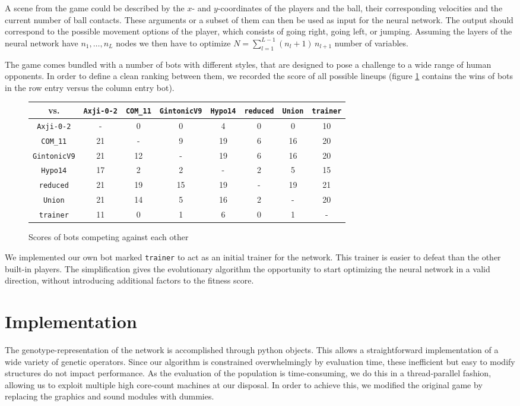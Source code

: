 \documentclass[11pt,a4paper]{scrartcl}
\begin{document}
A scene from the game could be described by the $x$- and $y$-coordinates of the players and the ball, their corresponding velocities and the current number of ball contacts.
These arguments or a subset of them can then be used as input for the neural network.
The output should correspond to the possible movement options of the player, which consists of going right, going left, or jumping.
Assuming the layers of the neural network have $n_1,\dots,n_L$ nodes we then have to optimize \(N = \sum_{l=1}^{L-1} (n_l+1) \, n_{l+1}\) number of variables.

The game comes bundled with a number of bots with different styles, that are designed to pose a challenge to a wide range of human opponents. In order to define a clean ranking between them, we recorded the score of all possible lineups (figure \ref{tab:bot_vs_bot} contains the wins of bots in the row entry versus the column entry bot).

\begin{figure}[H]
\begin{tabular}{c|ccccccc}
vs. &
\texttt{Axji-0-2} &
\texttt{COM\_11} &
\texttt{GintonicV9} &
\texttt{Hypo14} &
\texttt{reduced} &
\texttt{Union} &
\texttt{trainer} \\
\hline
\texttt{Axji-0-2} & - & 0 & 0 & 4 & 0 & 0 & 10 \\
\texttt{COM\_11} & 21 & - & 9 & 19 & 6 & 16 & 20 \\
\texttt{GintonicV9} & 21 & 12 & - & 19 & 6 & 16 & 20 \\
\texttt{Hypo14} & 17 & 2 & 2 & - & 2 & 5 & 15 \\
\texttt{reduced} & 21 & 19 & 15 & 19 & - & 19 & 21 \\
\texttt{Union} & 21 & 14 & 5 & 16 & 2 & - & 20 \\
\texttt{trainer} & 11 & 0 & 1 & 6 & 0 & 1 & -
\end{tabular}
\label{tab:bot_vs_bot}
\caption{Scores of bots competing against each other}
\end{figure}

We implemented our own bot marked \texttt{trainer} to act as an initial trainer for the network.
This trainer is easier to defeat than the other built-in players.
The simplification gives the evolutionary algorithm the opportunity to start optimizing the neural network in a valid direction, without introducing additional factors to the fitness score.

\section{Implementation}
The genotype-representation of the network is accomplished through python objects. This allows a straightforward implementation of a wide variety of genetic operators. Since our algorithm is constrained overwhelmingly by evaluation time, these inefficient but easy to modify structures do not impact performance.
As the evaluation of the population is time-consuming, we do this in a thread-parallel fashion, allowing us to exploit multiple high core-count machines at our disposal. In order to achieve this, we modified the original game by replacing the graphics and sound modules with dummies.
\end{document}
